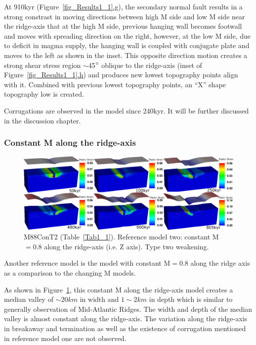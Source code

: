 At 910kyr (Figure~\hyperref[fig_Results1_1]{\ref{fig_Results1_1}.g}), the secondary normal fault results in a strong constrast in moving directions between high M side and low M side near the ridge-axis that at the high M side, previous hanging wall becomes footwall and moves with spreading direction on the right, however, at the low M side, due to deficit in magma supply, the hanging wall is coupled with conjugate plate and moves to the left as shown in the inset. This opposite direction motion creates a strong shear stress region $\sim$45$\degree$ oblique to the ridge-axis (inset of Figure~\hyperref[fig_Results1_1]{\ref{fig_Results1_1}.h}) and produces new lowest topography points align with it. Combined with previous lowest topography points, an ``X'' shape topography low is created.

Corrugations are observed in the model since 240kyr. It will be further discussed in the discussion chapter.

\subsubsection{Constant M along the ridge-axis }

\begin{figure}[h]
  \centering
    \includegraphics[width=1.0\textwidth]{fig_Results1_3.eps}
  \caption{M88ConT2 (Table~\hyperref[Tab1_1]{\ref{Tab1_1}}). Reference model two: constant M$=0.8$ along the ridge-axis (i.e. Z axis). Type two weakening.}
 \label{fig_Results1_3}
\end{figure}   

Another reference model is the model with constant M$=0.8$ along the ridge axis as a comparison to the changing M models.

As shown in Figure~\hyperref[fig_Results1_3]{\ref{fig_Results1_3}}, this constant M along the ridge-axis model creates a median valley of $\sim 20km$ in width and $1\sim2km$ in depth which is similar to generally observation of Mid-Atlantic Ridges. The width and depth of the median valley is almost constant along the ridge-axis. The variation along the ridge-axis in breakaway and termination as well as the existence of corrugation mentioned in reference model one are not observed. 

